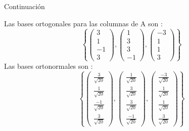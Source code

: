 \documentclass[11pt]{beamer}
\begin{document}
\begin{frame}{Continuación}

Las bases ortogonales para las columnas de A son :
\begin{equation*}
    \left \{ \begin{pmatrix}
         3 \\ 1 \\ -1 \\ 3
     \end{pmatrix} ,
     \begin{pmatrix}
         1 \\ 3 \\ 3 \\ -1
     \end{pmatrix} , 
     \begin{pmatrix}
         -3 \\ 1 \\ 1 \\ 3
     \end{pmatrix}\right
     \} 
\end{equation*}
Las bases ortonormales son :
\begin{equation*}
    \left \{ \begin{pmatrix}
         \frac{3}{\sqrt{20}} \\ \frac{1 }{\sqrt{20}} \\ \frac{-1}{\sqrt{20}} \\ \frac{3}{\sqrt{20}}
     \end{pmatrix} ,
     \begin{pmatrix}
         \frac{1}{\sqrt{20}} \\ \frac{3}{\sqrt{20}} \\ \frac{3}{\sqrt{20}} \\ \frac{-1}{\sqrt{20}}
     \end{pmatrix} , 
     \begin{pmatrix}
         \frac{-3}{\sqrt{20}} \\ \frac{1}{\sqrt{20}} \\ \frac{1}{\sqrt{20}} \\ \frac{3}{\sqrt{20}}
      \end{pmatrix}\right
     \} 
\end{equation*}

    
\end{frame}
\end{document}
